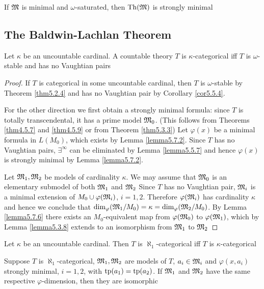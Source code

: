 \documentclass[11pt]{article}
\begin{document}
\begin{exercise}
\label{ex5.7.1}
If \(\mathfrak{M}\) is minimal and \(\omega\)-saturated, then \(\operatorname{Th}(\mathfrak{M})\) is strongly minimal
\end{exercise}


\subsection{The Baldwin-Lachlan Theorem}
\label{sec:org1ffa1f5}
\begin{theorem}
Let \(\kappa\) be an uncountable cardinal. A countable theory \(T\) is \(\kappa\)-categorical iff \(T\) is
\(\omega\)-stable and has no Vaughtian pairs
\end{theorem}

\begin{proof}
If \(T\) is categorical in some uncountable cardinal, then \(T\) is \(\omega\)-stable by Theorem
\ref{thm5.2.4} and has no Vaughtian pair by Corollary \ref{cor5.5.4}.

For the other direction we first obtain a strongly minimal formula: since \(T\) is totally
transcendental, it has a prime model \(\mathfrak{M}_0\). (This follows from Theorems \ref{thm4.5.7} and
\ref{thm4.5.9} or from Theorem \ref{thm5.3.3}) Let \(\varphi(x)\) be a minimal formula in \(L(M_0)\),
which exists by Lemma \ref{lemma5.7.2}. Since \(T\) has no Vaughtian pairs, \(\exists^\infty\) can be
eliminated by Lemma \ref{lemma5.5.7} and hence \(\varphi(x)\) is strongly minimal by Lemma
\ref{lemma5.7.2}.

Let \(\mathfrak{M}_1,\mathfrak{M}_2\) be models of cardinality \(\kappa\). We may assume that \(\mathfrak{M}_0\) is an elementary submodel
of both \(\mathfrak{M}_1\) and \(\mathfrak{M}_2\)
Since \(T\) has no Vaughtian pair, \(\mathfrak{M}_i\) is a minimal extension of \(M_0\cup\varphi(\mathfrak{M}_i)\), \(i=1,2\).
Therefore \(\varphi(\mathfrak{M}_i)\) has cardinality \(\kappa\) and hence we conclude
that \(\dim_\varphi(\mathfrak{M}_1/M_0)=\kappa=\dim_\varphi(\mathfrak{M}_2/M_0)\). By Lemma \ref{lemma5.7.6} there exists
an \(M_0\)-equivalent map from \(\varphi(\mathfrak{M}_0)\) to \(\varphi(\mathfrak{M}_1)\), which by Lemma \ref{lemma5.3.8} extends to
an isomorphism from \(\mathfrak{M}_1\) to \(\mathfrak{M}_2\)
\end{proof}

\begin{corollary}[]
Let \(\kappa\) be an uncountable cardinal. Then \(T\) is \(\aleph_1\)-categorical iff \(T\) is \(\kappa\)-categorical
\end{corollary}

\begin{corollary}[]
Suppose \(T\) is \(\aleph_1\)-categorical, \(\mathfrak{M}_1,\mathfrak{M}_2\) are models of \(T\), \(a_i\in\mathfrak{M}_i\) and \(\varphi(x,a_i)\)
strongly minimal, \(i=1,2\), with \(\operatorname{tp}(a_1)=\operatorname{tp}(a_2)\). If \(\mathfrak{M}_1\) and \(\mathfrak{M}_2\) have the same
respective \(\varphi\)-dimension, then they are isomorphic
\end{corollary}
\end{document}
